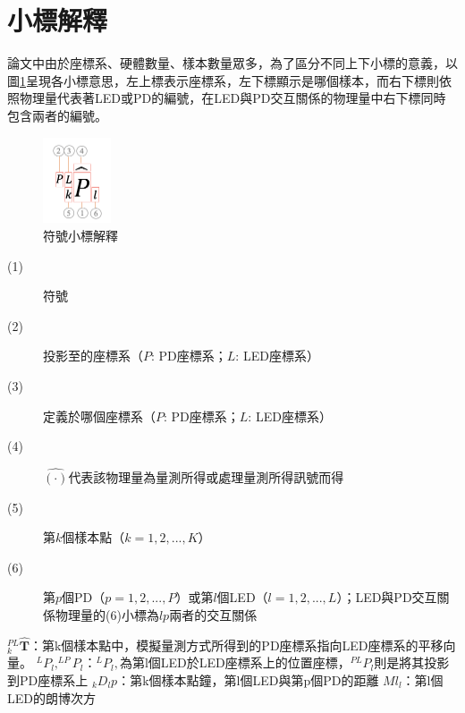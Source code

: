 \onehalfspacing

\section*{小標解釋}

論文中由於座標系、硬體數量、樣本數量眾多，為了區分不同上下小標的意義，以圖\ref{pic:symbol}呈現各小標意思，左上標表示座標系，左下標顯示是哪個樣本，而右下標則依照物理量代表著LED或PD的編號，在LED與PD交互關係的物理量中右下標同時包含兩者的編號。

\begin{figure}[ht]
	\centering
	\includegraphics[width=2cm]{ch1pic/not_whole.png}
    \caption{符號小標解釋}
    \label{pic:symbol}
\end{figure}



\begin{description}
    \item[(1)] 符號
    \item[(2)] 投影至的座標系（$P$: PD座標系；$L$: LED座標系）
    \item[(3)] 定義於哪個座標系（$P$: PD座標系；$L$: LED座標系）
    \item[(4)] $\hat{(\cdot)}$代表該物理量為量測所得或處理量測所得訊號而得
    \item[(5)] 第$k$個樣本點（$k=1,2,...,K$）
    \item[(6)] 第$p$個PD（$p=1,2,...,P$）或第$l$個LED（$l=1,2,...,L$）；LED與PD交互關係物理量的(6)小標為$lp$兩者的交互關係
\end{description}

$^{PL}_{k}\hat{\boldsymbol{T}}$：第k個樣本點中，模擬量測方式所得到的PD座標系指向LED座標系的平移向量。
$^{L}P_l,^{LP}P_l$：$^{L}P_l,$為第l個LED於LED座標系上的位置座標，$^{PL}P_l$則是將其投影到PD座標系上
$_{k}D_lp$：第k個樣本點鐘，第l個LED與第p個PD的距離
$Ml_l$：第l個LED的朗博次方